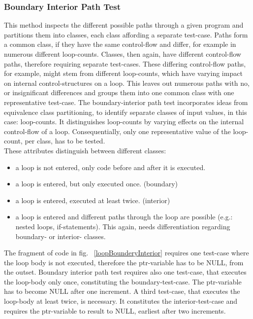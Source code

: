 		\subsubsection{Boundary Interior Path Test}
		This method inspects the different possible paths through a given program and partitions them into classes, each class affording a separate test-case. Paths form a common class, if they have the same control-flow and differ, for example in numerous different loop-counts. Classes, then again, have different control-flow paths, therefore requiring separate test-cases. These differing control-flow paths, for example, might stem from different loop-counts, which have varying impact on internal control-structures on a loop. This leaves out numerous paths with no, or insignificant differences and groups them into one common class with one representative test-case. \cite{Howden1975MethodologyFT} The boundary-interior path test incorporates ideas from equivalence class partitioning, to identify separate classes of input values, in this case: loop-counts. It distinguishes loop-counts by varying effects on the internal control-flow of a loop. Consequentially, only one representative value of the loop-count, per class, has to be tested. \\
		These attributes distinguish between different classes:
		\begin{itemize} \setlength\itemsep{1px}
		\item a loop is not entered, only code before and after it is executed.
		\item a loop is entered, but only executed once. (boundary)
		\item a loop is entered, executed at least twice. (interior)
		\item a loop is entered and different paths through the loop are possible (e.g.: nested loops, if-statements). This again, needs differentiation regarding boundary- or interior- classes. 
		\end{itemize}
		
		
		
		The fragment of code in fig. ~\ref{loopBounderyInterior} requires one test-case where the loop body is not executed, therefore the ptr-variable has to be NULL, from the outset.
		Boundary interior path test requires also one test-case, that executes the loop-body only once, constituting the boundary-test-case. The ptr-variable has to become NULL after one increment.
		A third test-case, that executes the loop-body at least twice, is necessary. It constitutes the interior-test-case and requires the ptr-variable to result to NULL, earliest after two increments.
		
